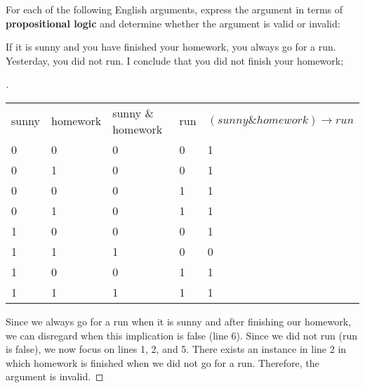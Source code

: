 \documentclass[12pt]{article}
\newenvironment{exercise}[2][Exercise]{\begin{trivlist}
\item[\hskip \labelsep {\bfseries #1}\hskip \labelsep {\bfseries #2.}]}{\end{trivlist}}
\newenvironment{solution}[1][{\color{red} Solution:}]{\begin{trivlist}
\item[\hskip \labelsep {\bfseries #1}\hskip \labelsep {\bfseries}]}{\end{trivlist}}
\begin{document}
 

\newcommand{\teamName}{Team 7} %

\newcommand{\collaborators}{
	Team: \textit{Sabrina Hatch, Ramsha Rauf, Shalom Mhanda}
}


\begin{exercise}{1}
For each of the following English arguments, express the argument in terms of \textbf{propositional logic} and determine whether the argument is valid or invalid:

\begin{enumerate}[(a)]


\item If it is sunny and you have finished your homework, you always go for a run. Yesterday, you did not run. I conclude that you did not finish your homework; 
    \begin{solution} 
        \begin{proof}[\unskip\nopunct]
\begin{table}[h]
\begin{tabular}{lllll}
sunny & homework & sunny \& homework & run & $(sunny \& homework) \rightarrow run$ \\
0     & 0        & 0                 & 0   & 1                                   \\
0     & 1        & 0                 & 0   & 1                                     \\
0     & 0        & 0                 & 1   & 1                                     \\
0     & 1        & 0                 & 1   & 1                                     \\
1     & 0        & 0                 & 0   & 1                                     \\
1     & 1        & 1                & 0    & 0                                \\
1     & 0        & 0                 & 1   & 1                                     \\
1     & 1        & 1                 & 1   & 1                                    
\end{tabular}
\end{table}
            Since we always go for a run when it is sunny and after finishing our homework,  we can disregard when this implication is false (line 6). Since we did not run (run is false), we now focus on lines 1, 2, and 5. There exists an instance in line 2 in which homework is finished when we did not go for a run. Therefore, the argument is invalid. 
        \end{proof}


\end{solution}
\end{enumerate}
\end{exercise}
\end{document}
